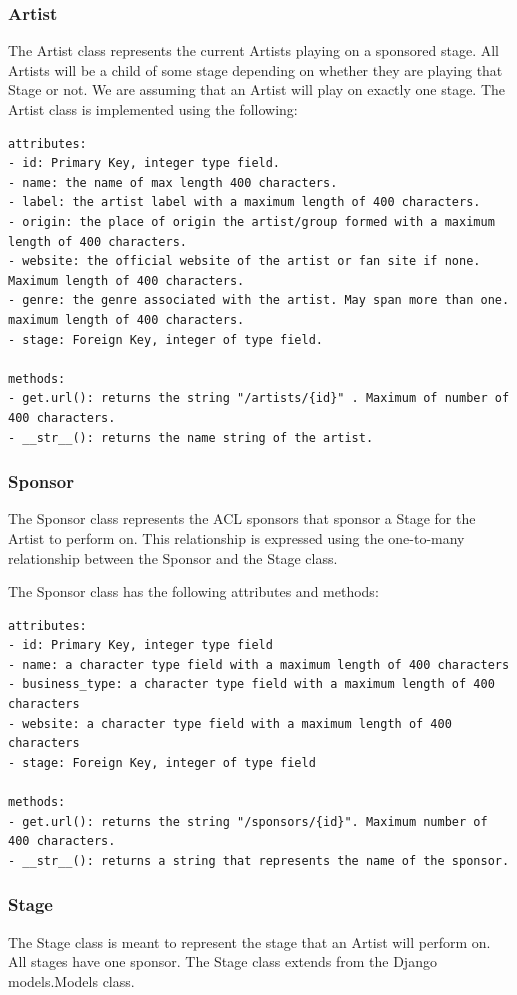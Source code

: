 \documentclass[12pt,english]{scrartcl}
\begin{document}
\subsubsection{Artist}
The Artist class represents the current Artists playing on a sponsored stage. All Artists will be a child of some
stage depending on whether they are playing that Stage or not. We are assuming that an Artist will play on 
exactly one stage. The Artist class is implemented using the following:
\begin{verbatim}
attributes:
- id: Primary Key, integer type field.
- name: the name of max length 400 characters.
- label: the artist label with a maximum length of 400 characters.
- origin: the place of origin the artist/group formed with a maximum length of 400 characters.
- website: the official website of the artist or fan site if none. Maximum length of 400 characters.
- genre: the genre associated with the artist. May span more than one. maximum length of 400 characters.
- stage: Foreign Key, integer of type field.

methods:
- get.url(): returns the string "/artists/{id}" . Maximum of number of 400 characters.
- __str__(): returns the name string of the artist.
\end{verbatim}


\subsubsection{Sponsor}
The Sponsor class represents the ACL sponsors that sponsor a Stage for the Artist to perform on.
This relationship is expressed using the one-to-many relationship between the Sponsor and the Stage
class. 

The Sponsor class has the following attributes and methods:
\begin{verbatim}
attributes:
- id: Primary Key, integer type field
- name: a character type field with a maximum length of 400 characters
- business_type: a character type field with a maximum length of 400 characters
- website: a character type field with a maximum length of 400 characters
- stage: Foreign Key, integer of type field

methods:
- get.url(): returns the string "/sponsors/{id}". Maximum number of 400 characters.
- __str__(): returns a string that represents the name of the sponsor.
\end{verbatim}

\subsubsection{Stage}
The Stage class is meant to represent the stage that an Artist will perform on. All stages
have one sponsor. The Stage class extends from the Django models.Models class.
\end{document}
